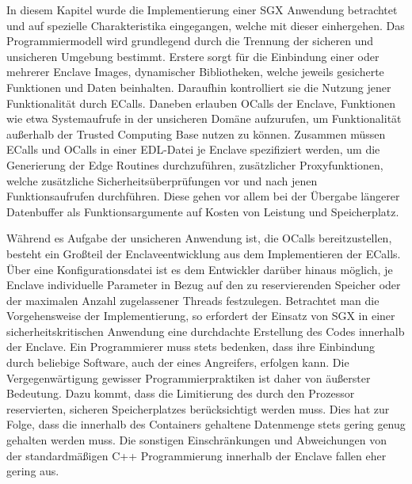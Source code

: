 In diesem Kapitel wurde die Implementierung einer \ac{SGX} Anwendung betrachtet und auf spezielle Charakteristika eingegangen, welche mit dieser einhergehen. Das Programmiermodell wird grundlegend durch die Trennung der sicheren und unsicheren Umgebung bestimmt. Erstere sorgt für die Einbindung einer oder mehrerer Enclave Images, dynamischer Bibliotheken, welche jeweils gesicherte Funktionen und Daten beinhalten. Daraufhin kontrolliert sie die Nutzung jener Funktionalität durch \acp{ECall}. Daneben erlauben \acp{OCall} der Enclave, Funktionen wie etwa Systemaufrufe in der unsicheren Domäne aufzurufen, um Funktionalität außerhalb der Trusted Computing Base nutzen zu können. Zusammen müssen \acp{ECall} und \acp{OCall} in einer \ac{EDL}-Datei  je Enclave spezifiziert werden, um die Generierung der Edge Routines durchzuführen, zusätzlicher Proxyfunktionen, welche zusätzliche Sicherheitsüberprüfungen vor und nach jenen Funktionsaufrufen durchführen. Diese gehen vor allem bei der Übergabe längerer Datenbuffer als Funktionsargumente auf Kosten von Leistung und Speicherplatz.

Während es Aufgabe der unsicheren Anwendung ist, die \acp{OCall} bereitzustellen, besteht ein Großteil der Enclaveentwicklung aus dem Implementieren der \acp{ECall}. Über eine Konfigurationsdatei ist es dem Entwickler darüber hinaus möglich, je Enclave individuelle Parameter in Bezug auf den zu reservierenden Speicher oder der maximalen Anzahl zugelassener Threads festzulegen. Betrachtet man die Vorgehensweise der Implementierung, so erfordert der Einsatz von \ac{SGX} in einer sicherheitskritischen Anwendung eine durchdachte Erstellung des Codes innerhalb der Enclave. Ein Programmierer muss stets bedenken, dass ihre Einbindung durch beliebige Software, auch der eines Angreifers, erfolgen kann. Die Vergegenwärtigung gewisser Programmierpraktiken ist daher von äußerster Bedeutung. Dazu kommt, dass die Limitierung des durch den Prozessor reservierten, sicheren Speicherplatzes berücksichtigt werden muss. Dies hat zur Folge, dass die innerhalb des Containers gehaltene Datenmenge stets gering genug gehalten werden muss. Die sonstigen Einschränkungen und Abweichungen von der standardmäßigen C++ Programmierung innerhalb der Enclave fallen eher gering aus.